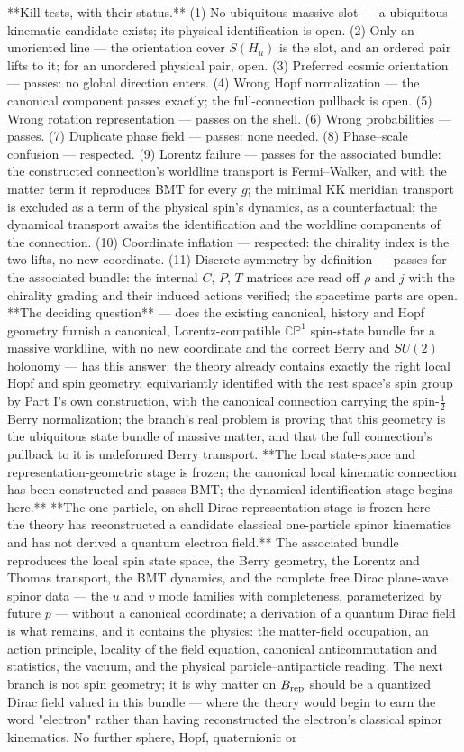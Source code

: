 **Kill tests, with their status.** (1) No ubiquitous massive slot — a ubiquitous kinematic candidate exists; its physical identification is open. (2) Only an unoriented line — the orientation cover $S(H_u)$ is the slot, and an ordered pair lifts to it; for an unordered physical pair, open. (3) Preferred cosmic orientation — passes: no global direction enters. (4) Wrong Hopf normalization — the canonical component passes exactly; the full-connection pullback is open. (5) Wrong rotation representation — passes on the shell. (6) Wrong probabilities — passes. (7) Duplicate phase field — passes: none needed. (8) Phase–scale confusion — respected. (9) Lorentz failure — passes for the associated bundle: the constructed connection's worldline transport is Fermi–Walker, and with the matter term it reproduces BMT for every $g$; the minimal KK meridian transport is excluded as a term of the physical spin's dynamics, as a counterfactual; the dynamical transport awaits the identification and the worldline components of the connection. (10) Coordinate inflation — respected: the chirality index is the two lifts, no new coordinate. (11) Discrete symmetry by definition — passes for the associated bundle: the internal $C$, $P$, $T$ matrices are read off $\rho$ and $j$ with the chirality grading and their induced actions verified; the spacetime parts are open. **The deciding question** — does the existing canonical, history and Hopf geometry furnish a canonical, Lorentz-compatible $\mathbb{CP}^1$ spin-state bundle for a massive worldline, with no new coordinate and the correct Berry and $SU(2)$ holonomy — has this answer: the theory already contains exactly the right local Hopf and spin geometry, equivariantly identified with the rest space's spin group by Part I's own construction, with the canonical connection carrying the spin-$\tfrac12$ Berry normalization; the branch's real problem is proving that this geometry is the ubiquitous state bundle of massive matter, and that the full connection's pullback to it is undeformed Berry transport. **The local state-space and representation-geometric stage is frozen; the canonical local kinematic connection has been constructed and passes BMT; the dynamical identification stage begins here.** **The one-particle, on-shell Dirac representation stage is frozen here — the theory has reconstructed a candidate classical one-particle spinor kinematics and has not derived a quantum electron field.** The associated bundle reproduces the local spin state space, the Berry geometry, the Lorentz and Thomas transport, the BMT dynamics, and the complete free Dirac plane-wave spinor data — the $u$ and $v$ mode families with completeness, parameterized by future $p$ — without a canonical coordinate; a derivation of a quantum Dirac field is what remains, and it contains the physics: the matter-field occupation, an action principle, locality of the field equation, canonical anticommutation and statistics, the vacuum, and the physical particle–antiparticle reading. The next branch is not spin geometry; it is why matter on $B_{\rm rep}$ should be a quantized Dirac field valued in this bundle — where the theory would begin to earn the word "electron" rather than having reconstructed the electron's classical spinor kinematics. No further sphere, Hopf, quaternionic or 